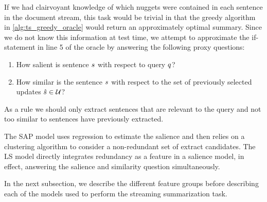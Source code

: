 


If we had clairvoyant knowledge of which nuggets were contained in each
sentence in the document stream,
this task would be trivial in that the greedy algorithm in 
\autoref{alg:ts_greedy_oracle} would return an approximately optimal summary.
Since we do not know this information at test time, we attempt to approximate
the if-statement in line 5 of the oracle by answering the following proxy 
questions:
\begin{enumerate}
    \item How salient is sentence $s$ with respect to query $q$?
    \item How similar is the sentence $s$ with respect to the set of 
            previously selected updates $\hat{s} \in \mathcal{U}$?
\end{enumerate}
As a rule we should only extract sentences that are relevant to the query
and not too similar to sentences have previously extracted.


The SAP model uses regression to estimate the salience and then relies on 
a clustering algorithm to consider a non-redundant set of extract candidates.
The LS model directly integrates redundancy as a feature in a salience model,
in effect, answering the salience and similarity question simultaneously. 

In the next subsection, we describe the different feature
groups before describing each of the models used to perform the streaming
summarization task.
